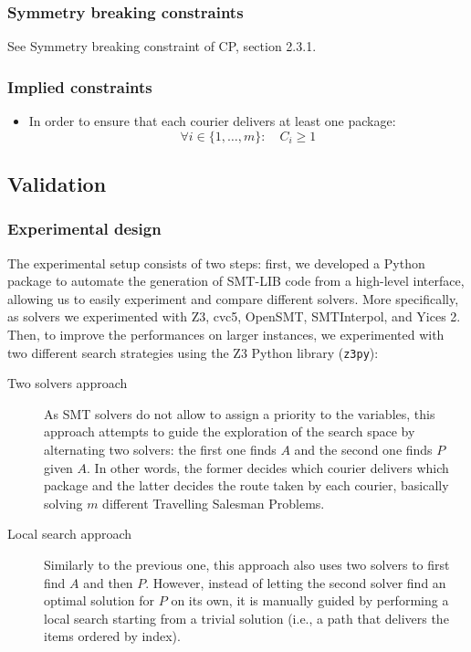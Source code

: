 \subsubsection{Symmetry breaking constraints}
See Symmetry breaking constraint of CP, section 2.3.1. 

\subsubsection{Implied constraints}

\begin{itemize}
    \item In order to ensure that each courier delivers at least one package:
    \begin{equation}
        \forall i \in \{1, \dots, m\}: \quad C_i \geq 1  
    \end{equation}
\end{itemize}


\subsection{Validation}


\subsubsection{Experimental design}

The experimental setup consists of two steps: first, we developed a Python package to automate the generation of SMT-LIB code from a high-level interface, allowing us to easily experiment and compare different solvers. More specifically, as solvers we experimented with Z3, cvc5, OpenSMT, SMTInterpol, and Yices 2. Then, to improve the performances on larger instances, we experimented with two different search strategies using the Z3 Python library (\texttt{z3py}):
\begin{description}
    \item[Two solvers approach]
        As SMT solvers do not allow to assign a priority to the variables, this approach attempts to guide the exploration of the search space by alternating two solvers: the first one finds $A$ and the second one finds $P$ given $A$. In other words, the former decides which courier delivers which package and the latter decides the route taken by each courier, basically solving $m$ different Travelling Salesman Problems. 

    \item[Local search approach]
        Similarly to the previous one, this approach also uses two solvers to first find $A$ and then $P$. However, instead of letting the second solver find an optimal solution for $P$ on its own, it is manually guided by performing a local search starting from a trivial solution (i.e., a path that delivers the items ordered by index).
\end{description}

